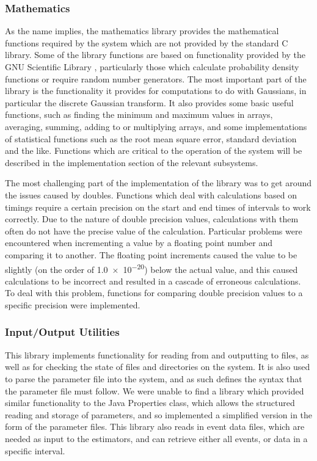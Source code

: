 \documentclass[a4paper,11pt]{article}
\begin{document}
\subsubsection{Mathematics}
\label{sec-3-3-2}

    As the name implies, the mathematics library provides the mathematical
    functions required by the system which are not provided by the standard C
    library. Some of the library functions are based on functionality provided
    by the GNU Scientific Library \cite{gsl}, particularly those which calculate
    probability density functions or require random number generators. The most
    important part of the library is the functionality it provides for
    computations to do with Gaussians, in particular the discrete Gaussian
    transform. It also provides some basic useful functions, such as finding the
    minimum and maximum values in arrays, averaging, summing, adding to or
    multiplying arrays, and some implementations of statistical functions such
    as the root mean square error, standard deviation and the like. Functions
    which are critical to the operation of the system will be described in the
    implementation section of the relevant subsystems.

    The most challenging part of the implementation of the library was to get
    around the issues caused by doubles. Functions which deal with calculations
    based on timings require a certain precision on the start and end times of
    intervals to work correctly. Due to the nature of double precision values,
    calculations with them often do not have the precise value of the
    calculation. Particular problems were encountered when incrementing a value
    by a floating point number and comparing it to another. The floating point
    increments caused the value to be slightly (on the order of \num{1.0e-20})
    below the actual value, and this caused calculations to be incorrect and
    resulted in a cascade of erroneous calculations. To deal with this problem,
    functions for comparing double precision values to a specific precision were
    implemented.
\subsubsection{Input/Output Utilities}
\label{sec-3-3-3}

    This library implements functionality for reading from and outputting to
    files, as well as for checking the state of files and directories on the
    system. It is also used to parse the parameter file into the system, and as
    such defines the syntax that the parameter file must follow. We were unable
    to find a library which provided similar functionality to the Java
    Properties class, which allows the structured reading and storage of
    parameters, and so implemented a simplified version in the form of the
    parameter files. This library also reads in event data files, which are
    needed as input to the estimators, and can retrieve either all events, or
    data in a specific interval.
\end{document}
